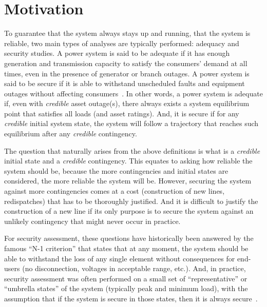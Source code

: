 \section{Motivation}

To guarantee that the system always stays up and running, \ie that the system is reliable,  two main types of analyses are typically performed: adequacy and security studies. A power system is said to be adequate if it has enough generation and transmission capacity to satisfy the consumers' demand at all times, even in the presence of generator or branch outages. A power system is said to be secure if it is able to withstand unscheduled faults and equipment outages without affecting consumers~\cite{AdequancySecurityDefinition}. In other words, a power system is adequate if, even with \emph{credible} asset outage(s), there always exists a system equilibrium point that satisfies all loads (and asset ratings). And, it is secure if for any \emph{credible} initial system state, the system will follow a trajectory that reaches such equilibrium after any \emph{credible} contingency.

The question that naturally arises from the above definitions is what is a \emph{credible} initial state and a \emph{credible} contingency. This equates to asking how reliable the system should be, because the more contingencies and initial states are considered, the more reliable the system will be. However, securing the system against more contingencies comes at a cost (construction of new lines, redispatches) that has to be thoroughly justified. And it is difficult to justify the construction of a new line if its only purpose is to secure the system against an unlikely contingency that might never occur in practice.

For security assessment, these questions have historically been answered by the famous ``N-1 criterion'' that states that at any moment, the system should be able to withstand the loss of any single element without consequences for end-users (no disconnection, voltages in acceptable range, etc.). And, in practice, security assessment was often performed on a small set of ``representative'' or ``umbrella states'' of the system (typically peak and minimum load), with the assumption that if the system is secure in those states, then it is always secure~\cite{CIGREreviewOfTools}.

